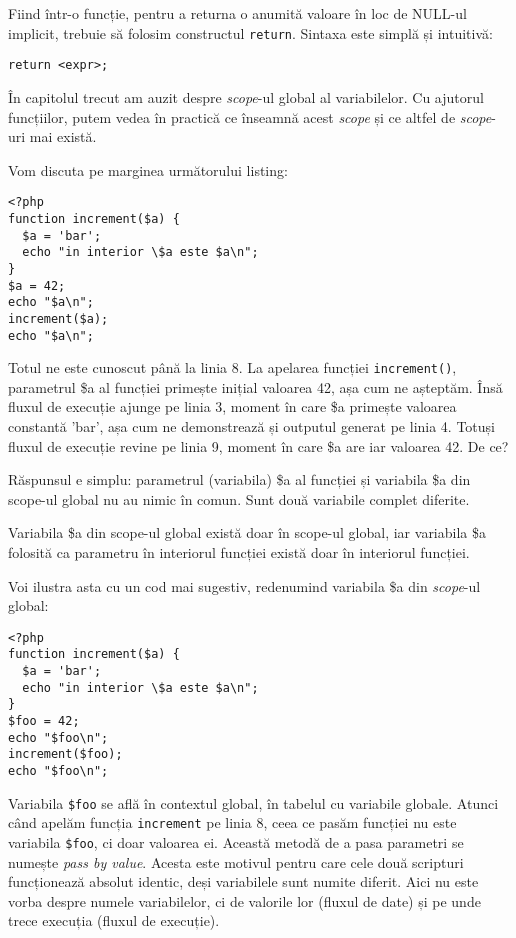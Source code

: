 Fiind într-o funcție, pentru a returna o anumită valoare în loc
de NULL-ul implicit, trebuie să folosim
constructul \texttt{return}. Sintaxa este simplă și intuitivă:
\begin{verbatim}
return <expr>;
\end{verbatim}

În capitolul trecut am auzit despre \textit{scope}-ul global al variabilelor.
Cu ajutorul funcțiilor, putem vedea în practică ce înseamnă acest \textit{scope}
și ce altfel de \textit{scope}-uri mai există.

Vom discuta pe marginea următorului listing:
\begin{lstlisting}
<?php
function increment($a) {
  $a = 'bar';
  echo "in interior \$a este $a\n";
}
$a = 42;
echo "$a\n";
increment($a);
echo "$a\n";
\end{lstlisting}

Totul ne este cunoscut până la linia 8. La apelarea funcției \texttt{increment()},
parametrul \$a al funcției primește inițial valoarea 42, așa cum ne așteptăm.
Însă fluxul de execuție ajunge pe linia 3, moment în care \$a primește valoarea
constantă 'bar', așa cum ne demonstrează și outputul generat pe linia 4.
Totuși fluxul de execuție revine pe linia 9, moment în care \$a are iar valoarea 42. De ce?

Răspunsul e simplu: parametrul (variabila) \$a al funcției și variabila \$a din scope-ul
global nu au nimic în comun. Sunt două variabile complet diferite.

Variabila \$a din scope-ul global există doar în scope-ul global, iar variabila \$a
folosită ca parametru în interiorul funcției există doar în interiorul funcției.

Voi ilustra asta cu un cod mai sugestiv, redenumind variabila \$a din \textsl{scope}-ul
global:
\begin{lstlisting}
<?php
function increment($a) {
  $a = 'bar';
  echo "in interior \$a este $a\n";
}
$foo = 42;
echo "$foo\n";
increment($foo);
echo "$foo\n";
\end{lstlisting}

Variabila \texttt{\$foo} se află în contextul global, în tabelul cu variabile globale. Atunci când apelăm
funcția \texttt{increment} pe linia 8, ceea ce pasăm funcției nu este variabila \texttt{\$foo}, ci doar
valoarea ei. Această metodă de a pasa parametri se numește \textsl{pass by value}.
Acesta este motivul pentru care cele două scripturi funcționează absolut identic, deși
variabilele sunt numite diferit. Aici nu este vorba despre numele variabilelor, ci de
valorile lor (fluxul de date) și pe unde trece execuția (fluxul de execuție).

